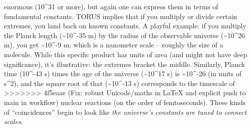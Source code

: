 \documentclass[]{article}
\begin{document}
\begin{itemize}
  enormous (10\^{}31 or more), but again one can express them in terms
  of fundamental constants. TORUS implies that if you multiply or divide
  certain extremes, you land back on known constants. A playful example:
  if you multiply the Planck length (\textasciitilde{}10\^{}-35 m) by
  the radius of the observable universe (\textasciitilde{}10\^{}26 m),
  you get \textasciitilde{}10\^{}-9 m, which is a nanometer scale --
  roughly the size of a molecule. While this specific product has units
  of area (and might not have deep significance), it's illustrative: the
  extremes bracket the middle. Similarly, Planck time (10\^{}-43 s)
  times the age of the universe (\textasciitilde{}10\^{}17 s) is
  \textasciitilde{}10\^{}-26 (in units of s\^{}2), and the square root
  of that (\textasciitilde{}10\^{}-13 s) corresponds to the timescale of
>>>>>>> 4f5eaae (Fix: robust Unicode/maths in LaTeX and explicit push to main in workflow)
  nuclear reactions (on the order of femtoseconds). These kinds of
  ``coincidences'' begin to look like \emph{the universe's constants are
  tuned to connect scales}.
\end{itemize}
\end{document}
